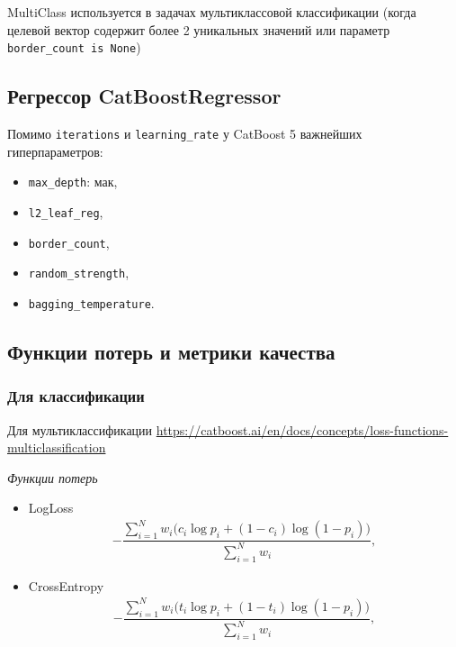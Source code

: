 \documentclass[%
	11pt,
	a4paper,
	utf8,
		]{article}
\begin{document}
MultiClass используется в задачах мультиклассовой классификации (когда целевой вектор содержит более 2 уникальных значений или параметр \verb|border_count is None|)

\subsection{Регрессор CatBoostRegressor}

Помимо \texttt{iterations} и \texttt{learning\_rate} у CatBoost 5 важнейших гиперпараметров:
\begin{itemize}
	\item \texttt{max\_depth}: мак,
	
	\item \texttt{l2\_leaf\_reg},
	
	\item \texttt{border\_count},
	
	\item \texttt{random\_strength},
	
	\item \texttt{bagging\_temperature}.
\end{itemize}

\subsection{Функции потерь и метрики качества}

\subsubsection{Для классификации}

Для мультиклассификации \url{https://catboost.ai/en/docs/concepts/loss-functions-multiclassification}

\emph{Функции потерь}
\begin{itemize}
	\item LogLoss
\begin{align*}
	- \dfrac{ \sum\limits_{i=1}^N w_i \big( c_i \log p_i + (1 - c_i) \log (1 - p_i) \big) }{ \sum\limits_{i=1}^{N} w_i },
\end{align*}

    \item CrossEntropy
\begin{align*}
	- \dfrac{ \sum\limits_{i=1}^N w_i \big( t_i \log p_i + (1 - t_i) \log (1 - p_i) \big) }{ \sum\limits_{i=1}^{N} w_i },
\end{align*}
\end{itemize}
\end{document}
